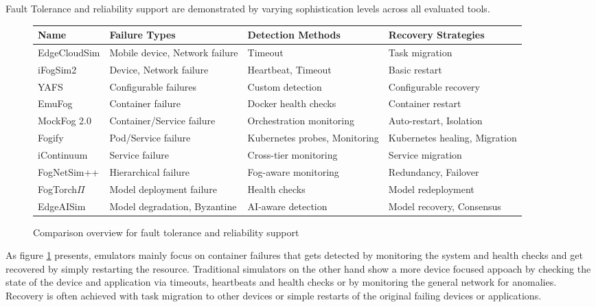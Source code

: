Fault Tolerance and reliability support are demonstrated by varying sophistication levels across all evaluated tools.
\begin{figure}[H]
  \centering
  \begin{tabularx}{\textwidth}{ l | X | X | X }
    \hline
    \textbf{Name} & \textbf{Failure Types} & \textbf{Detection Methods} & \textbf{Recovery Strategies}\\
    \hline\hline
    EdgeCloudSim  & Mobile device, Network failure  & Timeout                       & Task migration \\\hline
    iFogSim2      & Device, Network failure         & Heartbeat, Timeout            & Basic restart \\\hline
    YAFS          & Configurable failures           & Custom detection              & Configurable recovery \\\hline
    EmuFog        & Container failure               & Docker health checks          & Container restart \\\hline
    MockFog 2.0   & Container/Service failure       & Orchestration monitoring      & Auto-restart, Isolation \\\hline
    Fogify        & Pod/Service failure             & Kubernetes probes, Monitoring & Kubernetes healing, Migration \\\hline
    iContinuum    & Service failure                 & Cross-tier monitoring         & Service migration \\\hline
    FogNetSim++   & Hierarchical failure            & Fog-aware monitoring          & Redundancy, Failover \\\hline
    FogTorch$\Pi$ & Model deployment failure        & Health checks                 & Model redeployment \\\hline
    EdgeAISim     & Model degradation, Byzantine    & AI-aware detection            & Model recovery, Consensus \\\hline
  \end{tabularx}
  \caption{Comparison overview for fault tolerance and reliability support}
  \label{tab:analysis-fault-tolerance}
\end{figure}

As figure \ref{tab:analysis-fault-tolerance} presents, emulators mainly focus on container failures that gets detected by monitoring the system and health checks and get recovered by simply restarting the resource.
Traditional simulators on the other hand show a more device focused appoach by checking the state of the device and application via timeouts, heartbeats and health checks or by monitoring the general network for anomalies.
Recovery is often achieved with task migration to other devices or simple restarts of the original failing devices or applications.


